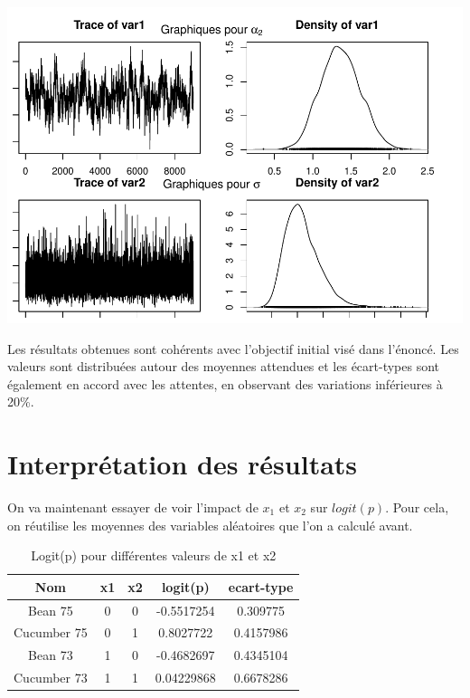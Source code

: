 \documentclass[
]{article}
\begin{document}
\begin{center}\includegraphics{projet1---rapport_files/figure-latex/unnamed-chunk-1-2} \end{center}

Les résultats obtenues sont cohérents avec l'objectif initial visé dans
l'énoncé. Les valeurs sont distribuées autour des moyennes attendues et
les écart-types sont également en accord avec les attentes, en observant
des variations inférieures à 20\%.

\hypertarget{interpruxe9tation-des-ruxe9sultats}{%
\section{Interprétation des
résultats}\label{interpruxe9tation-des-ruxe9sultats}}

On va maintenant essayer de voir l'impact de \(x_1\) et \(x_2\) sur
\(logit(p)\). Pour cela, on réutilise les moyennes des variables
aléatoires que l'on a calculé avant.

\begin{table}[h]
\centering
\small
\begin{tabular}{|c|c|c|c|c|}
\hline
\textbf{Nom} & \textbf{x1} & \textbf{x2} & \textbf{logit(p)} & \textbf{ecart-type}\\
\hline
Bean 75 & 0 & 0 & -0.5517254 & 0.309775 \\
Cucumber 75 & 0 & 1 & 0.8027722 & 0.4157986 \\
Bean 73 & 1 & 0 & -0.4682697 & 0.4345104 \\
Cucumber 73 & 1 & 1 & 0.04229868 & 0.6678286 \\
\hline
\end{tabular}
\caption{Logit(p) pour différentes valeurs de x1 et x2}
\label{tab:tableau_combine}
\end{table}
\end{document}
